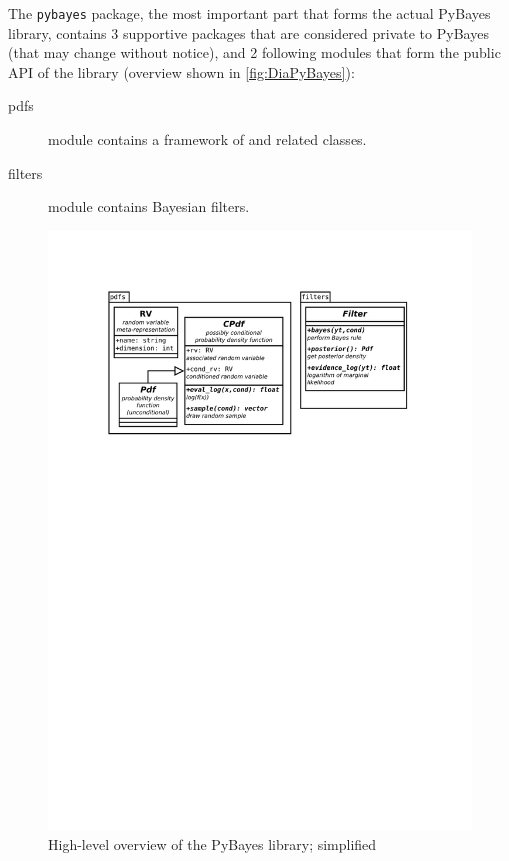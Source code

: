 The \verb|pybayes| package, the most important part that forms the actual PyBayes library, contains
3 supportive packages that are considered private to PyBayes (that may change without notice), and
2 following modules that form the public API of the library (overview shown in \autoref{fig:DiaPyBayes}):
\begin{description}
	\item[pdfs] module contains a framework of {\pdfs} and related classes.
	\item[filters] module contains Bayesian filters.
\end{description}

\begin{figure}[h]
	\centering
	\includegraphics[width=\textwidth,keepaspectratio=true,clip=true,trim=3cm 196mm 3cm 3cm]{./diagrams/PyBayes.pdf}
	\vspace{-8mm}
	\caption[High-level overview of the PyBayes library]{High-level overview of the PyBayes library;
	simplified}
	\label{fig:DiaPyBayes}
\end{figure}

